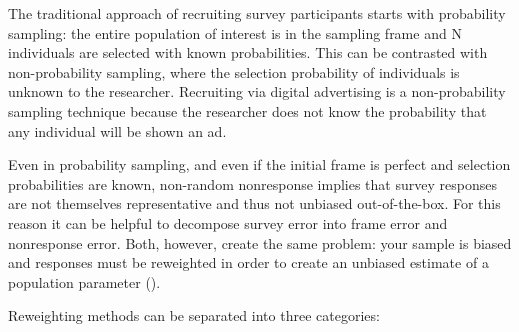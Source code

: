 \documentclass[a4paper,12pt]{article}
\theoremstyle{proposition}
\begin{document}
The traditional approach of recruiting survey participants starts with probability sampling: the entire population of interest is in the sampling frame and N individuals are selected with known probabilities. This can be contrasted with non-probability sampling, where the selection probability of individuals is unknown to the researcher. Recruiting via digital advertising is a non-probability sampling technique because the researcher does not know the probability that any individual will be shown an ad.

Even in probability sampling, and even if the initial frame is perfect and selection probabilities are known, non-random nonresponse implies that survey responses are not themselves representative and thus not unbiased out-of-the-box. For this reason it can be helpful to decompose survey error into frame error and nonresponse error. Both, however, create the same problem: your sample is biased and responses must be reweighted in order to create an unbiased estimate of a population parameter (\cite{Kolenikov2016}).

Reweighting methods can be separated into three categories:
\end{document}
